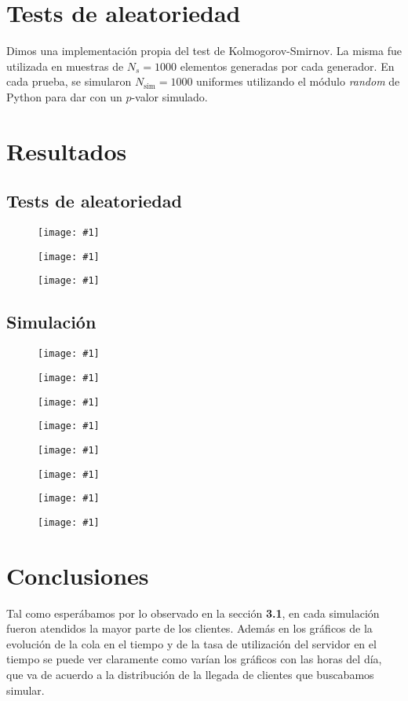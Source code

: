\documentclass[a4paper, 12pt]{article}
\newcommand{\insertimage}[1]{%
    \begin{figure}[hbtp!]
        \centering
        \texttt{[image: \#1]}
        \label{fig:#1}
    \end{figure}
}
\begin{document}
\section{Tests de aleatoriedad}

Dimos una implementación propia del test de Kolmogorov-Smirnov. La misma fue
utilizada en muestras de $N_s = 1000$ elementos generadas por cada generador. En
cada prueba, se simularon $N_{\text{sim}} = 1000$ uniformes utilizando el módulo
\textit{random} de Python para dar con un $p$-valor simulado.

\section{Resultados}

\subsection{Tests de aleatoriedad}

\insertimage{Media/test_GCL.png}
\insertimage{Media/test_XORShift.png}
\insertimage{Media/test_PCG.png}

\FloatBarrier

\subsection{Simulación}

\insertimage{Media/tiempos_de_ejecucion.png}
\insertimage{Media/distrib_tiempos_espera.png}
\insertimage{Media/promedio_tiempo_en_sis.png}
\insertimage{Media/evolucion_cola_tiempo.png}
\insertimage{Media/histograma_tiempos_espera.png}
\insertimage{Media/distribucion_del_tiempo_e_histograma_tiempo_servicio.png}
\insertimage{Media/porcentaje_servidor_ocupado.png}
\insertimage{Media/tasa_utilizacion_servidor_tiempo.png}

\FloatBarrier

\section{Conclusiones}

Tal como esperábamos por lo observado en la sección \textbf{3.1}, en cada simulación fueron atendidos la mayor parte de los clientes. Además en los gráficos de la evolución de la cola en el tiempo y de la tasa de utilización del servidor en el tiempo se puede ver claramente como varían los gráficos con las horas del día, que va de acuerdo a la distribución de la llegada de clientes que buscabamos simular.
\end{document}
